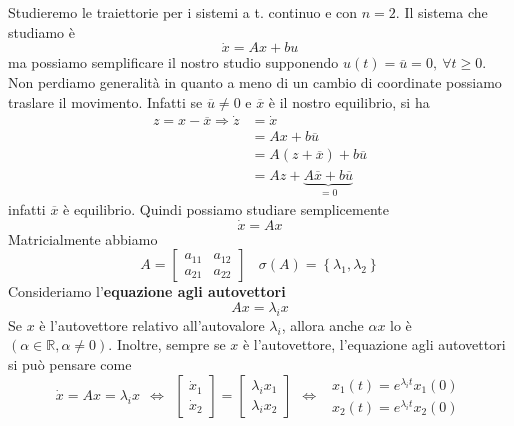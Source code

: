 \documentclass[10pt,a4paper]{book}
\begin{document}
Studieremo le traiettorie per i sistemi a t. continuo e con $n=2$. Il sistema che studiamo è
\begin{equation*}
\dot{x} =Ax+bu
\end{equation*}
ma possiamo semplificare il nostro studio supponendo $u\left( t\right) =\overline{u} =0,\ \forall t\geqslant 0$. Non perdiamo generalità in quanto a meno di un cambio di coordinate possiamo traslare il movimento. Infatti se $\overline{u} \neq 0$ e $\overline{x}$ è il nostro equilibrio, si ha
\begin{equation*}
\begin{aligned}
z=x-\overline{x} \Rightarrow \dot{z} & =\dot{x}\\
 & =Ax+b\overline{u}\\
 & =A\left( z+\overline{x}\right) +b\overline{u}\\
 & =Az+\underbrace{A\overline{x} +b\overline{u}}_{=0}
\end{aligned}
\end{equation*}
infatti $\overline{x}$ è equilibrio. Quindi possiamo studiare semplicemente
\begin{equation*}
\dot{x} =Ax
\end{equation*}
Matricialmente abbiamo
\begin{equation*}
A=\begin{bmatrix}
a_{11} & a_{12}\\
a_{21} & a_{22}
\end{bmatrix} \ \ \ \ \sigma \left( A\right) =\left\{\lambda _{1} ,\lambda _{2}\right\}
\end{equation*}
Consideriamo l'\textbf{equazione agli autovettori}
\begin{equation*}
\boxed{Ax=\lambda _{i} x}
\end{equation*}
Se $x$ è l'autovettore relativo all'autovalore $\lambda _{i}$, allora anche $\alpha x$ lo è $\left( \alpha \in \mathbb{R} ,\alpha \neq 0\right)$. Inoltre, sempre se $x$ è l'autovettore, l'equazione agli autovettori si può pensare come
\begin{equation*}
\dot{x} =Ax=\lambda _{i} x\ \ \Leftrightarrow \ \ \begin{bmatrix}
\dot{x}_{1}\\
\dot{x}_{2}
\end{bmatrix} =\begin{bmatrix}
\lambda _{i} x_{1}\\
\lambda _{i} x_{2}
\end{bmatrix} \ \ \Leftrightarrow \ \ \begin{array}{ c }
x_{1}\left( t\right) =e^{\lambda _{i} t} x_{1}\left( 0\right)\\
x_{2}\left( t\right) =e^{\lambda _{i} t} x_{2}\left( 0\right)
\end{array}
\end{equation*}
\end{document}
